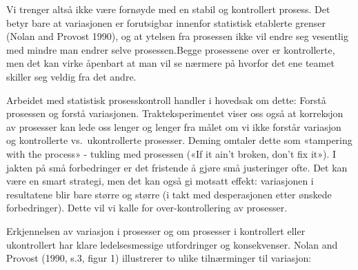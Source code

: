 \documentclass[
]{book}
\begin{document}
Vi trenger altså ikke være fornøyde med en stabil og kontrollert prosess. Det betyr bare at variasjonen er forutsigbar innenfor statistisk etablerte grenser (Nolan and Provost 1990), og at ytelsen fra prosessen ikke vil endre seg vesentlig med mindre man endrer selve prosessen.Begge prosessene over er kontrollerte, men det kan virke åpenbart at man vil se nærmere på hvorfor det ene teamet skiller seg veldig fra det andre.

Arbeidet med statistisk prosesskontroll handler i hovedsak om dette: Forstå prosessen og forstå variasjonen. Trakteksperimentet viser oss også at korreksjon av prosesser kan lede oss lenger og lenger fra målet om vi ikke forstår variasjon og kontrollerte vs.~ukontrollerte prosesser. Deming omtaler dette som «tampering with the process» - tukling med prosessen («If it ain't broken, don't fix it»). I jakten på små forbedringer er det fristende å gjøre små justeringer ofte. Det kan være en smart strategi, men det kan også gi motsatt effekt: variasjonen i resultatene blir bare større og større (i takt med desperasjonen etter ønskede forbedringer). Dette vil vi kalle for over-kontrollering av prosesser.

Erkjennelsen av variasjon i prosesser og om prosesser i kontrollert eller ukontrollert har klare ledelsesmessige utfordringer og konsekvenser. Nolan and Provost (1990, s.3, figur 1) illustrerer to ulike tilnærminger til variasjon:

\providecommand{\docline}[3]{\noalign{\global\setlength{\arrayrulewidth}{#1}}\arrayrulecolor[HTML]{#2}\cline{#3}}

\setlength{\tabcolsep}{2pt}

\renewcommand*{\arraystretch}{1.5}
\end{document}
